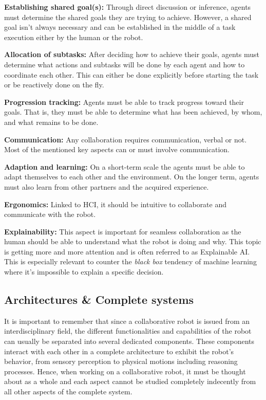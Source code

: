 \textbf{Establishing shared goal(s):} Through direct discussion or inference, agents must determine the shared goals they are trying to achieve. However, a shared goal isn't always necessary and can be established in the middle of a task execution either by the human or the robot.

\textbf{Allocation of subtasks:} After deciding how to achieve their goals, agents must determine what actions and subtasks will be done by each agent and how to coordinate each other. This can either be done explicitly before starting the task or be reactively done on the fly.

\textbf{Progression tracking:} Agents must be able to track progress toward their goals. That is, they must be able to determine what has been achieved, by whom, and what remains to be done. 

\textbf{Communication:} Any collaboration requires communication, verbal or not. Most of the mentioned key aspects can or must involve communication.

\textbf{Adaption and learning:} On a short-term scale the agents must be able to adapt themselves to each other and the environment. On the longer term, agents must also learn from other partners and the acquired experience.

\textbf{Ergonomics:} Linked to HCI, it should be intuitive to collaborate and communicate with the robot. 

\textbf{Explainability:} This aspect is important for seamless collaboration as the human should be able to understand what the robot is doing and why. This topic is getting more and more attention and is often referred to as Explainable AI. This is especially relevant to counter the \textit{black box} tendency of machine learning where it's impossible to explain a specific decision.   

\subsection{Architectures \& Complete systems}

It is important to remember that since a collaborative robot is issued from an interdisciplinary field, the different functionalities and capabilities of the robot can usually be separated into several dedicated components. These components interact with each other in a complete architecture to exhibit the robot's behavior, from sensory perception to physical motions including reasoning processes. 
Hence, when working on a collaborative robot, it must be thought about as a whole and each aspect cannot be studied completely indecently from all other aspects of the complete system. 

